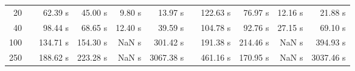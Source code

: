 {\begin{table}[h]
\begin{tabular}{rr rrrr r rrrr}
20 & & 62.39 s & 45.00 s & 9.80 s & 13.97 s && 122.63 s & 76.97 s & 12.16 s & 21.88 s \\ 
40 & & 98.44 s & 68.65 s & 12.40 s & 39.59 s && 104.78 s & 92.76 s & 27.15 s & 69.10 s \\ 
100 & & 134.71 s & 154.30 s &  NaN s & 301.42 s && 191.38 s & 214.46 s &  NaN s & 394.93 s \\ 
250 & & 188.62 s & 223.28 s &  NaN s & 3067.38 s && 461.16 s & 170.95 s &  NaN s & 3037.46 s \\ 
\hline 
\end{tabular} 
\end{table} 
} 
